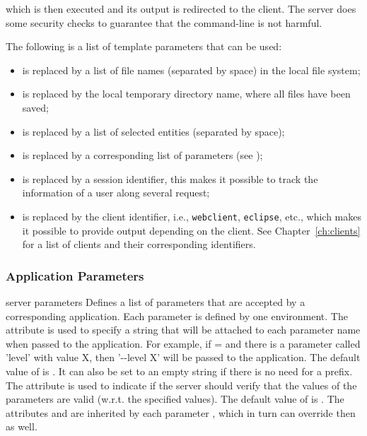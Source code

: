 {  \bigskip 
  \noindent
  which is then executed and its output is redirected to the
  client. The server does some security checks to guarantee that the
  command-line is not harmful. %

  \bigskip 
  \noindent
  The following is a list of template parameters that can be used:

  \begin{itemize}
  \item {} is replaced by a list of file
    names (separated by space) in the local file system;

  \item {} is replaced by the local
    temporary directory name, where all files have been saved;
  \item {} is replaced by a list of
    selected entities (separated by space);
  \item {} is replaced by a
    corresponding list of parameters (see );
  \item {} is replaced by a session
    identifier, this makes it possible to track the information of a
    user along several request;
  \item {} is replaced by the client
    identifier, i.e., \texttt{webclient}, \texttt{eclipse}, etc.,
    which makes it possible to provide output depending on the
    client. See Chapter~\ref{ch:clients} for a list of clients and
    their corresponding identifiers.
  \end{itemize}
%
}


\subsubsection{Application Parameters}

\bigskip 
\xmlstruct
{server}
{parameters} 
{%
%
  Defines a list of parameters that are accepted by a corresponding
  application. Each parameter is defined by one
   environment.
  The  attribute is used to specify a string
  that will be attached to each parameter name when passed to the
  application.
  For example, if = and
  there is a parameter called 'level' with value X, then '{-}{-}level
  X' will be passed to the application.  The default value of
   is . It can also be set
  to an empty string if there is no need for a prefix.
  The  attribute is used to indicate if the
  server should verify that the values of the parameters are valid
  (w.r.t. the specified values). The default value of
   is .
  The attributes  and  are
  inherited by each parameter , which in turn can
  override then as well.
%
}
{}%

